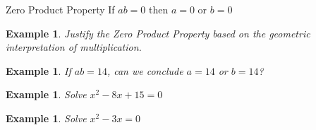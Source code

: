 \documentclass[twoside]{tufte-handout}
\newcounter{ekcounter}%
\theoremstyle{ekimcustom}
\newtheorem{exm}[ekcounter]{Example}
\begin{document}
%
%
%
% 
%
%
%
%
%
%

\begin{bmethod}{Zero Product Property}{}
If $ab=0$ then $a=0$ or $b=0$
\end{bmethod}
\begin{exm}
Justify the Zero Product Property based on the geometric interpretation of multiplication.
\end{exm}
\vskip10pt
\begin{exm}
If $ab = 14$, can we conclude $a=14$ or $b=14$?
\end{exm}
\vskip10pt
\begin{exm}
Solve $x^2-8x+15=0$
\end{exm}
\vskip10pt
\begin{exm}
Solve $x^2-3x=0$
\end{exm}
\vskip10pt
\end{document}
